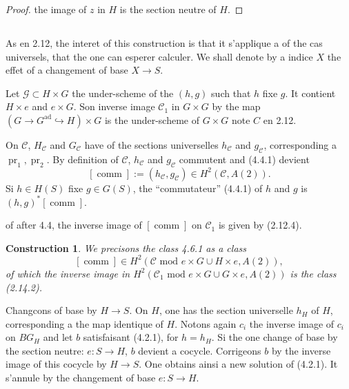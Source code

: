 \documentclass[11pt,a4paper]{article}
\theoremstyle{plain}
\newtheorem{construction}[theorem]{Construction}
\theoremstyle{definition}
\DeclareMathOperator{\ad}{ad}
\DeclareMathOperator{\pr}{pr}
\DeclareMathOperator{\comm}{comm}
\begin{document}
\begin{proof}
the image of $z$ in $H$ is the section neutre of $H$.
\end{proof}

\subsection{}\label{4.6}

As en 2.12, the interet of this construction is that it s'applique a of the cas universels, that the one can esperer calculer. We shall denote by a indice $X$ the effet of a changement of base $X \to S$.

Let $\mathscr{G} \subset H \times G$ the under-scheme of the $(h, g)$ such that $h$ fixe $g$. It contient $H \times e$ and $e \times G$. Son inverse image $\mathscr{C}_1$ in $G \times G$ by the map $(G \to G^{\ad} \hookrightarrow H) \times G$ is the under-scheme of $G \times G$ note $C$ en 2.12.

On $\mathscr{C}$, $H_{\mathscr{C}}$ and $G_{\mathscr{C}}$ have of the sections universelles $h_{\mathscr{C}}$ and $g_{\mathscr{C}}$, corresponding a $\pr_1, \pr_2$. By definition of $\mathscr{C}$, $h_{\mathscr{C}}$ and $g_{\mathscr{C}}$ commutent and (4.4.1) devient
\begin{equation}\label{4.6.1}
[\comm] := (h_{\mathscr{C}}, g_{\mathscr{C}}) \in H^2(\mathscr{C}, A(2)).
\end{equation}
Si $h \in H(S)$ fixe $g \in G(S)$, the ``commutateur'' (4.4.1) of $h$ and $g$ is $(h, g)^*[\comm]$.

of after 4.4, the inverse image of $[\comm]$ on $\mathscr{C}_1$ is given by (2.12.4).

\begin{construction}\label{4.7}
We precisons the class 4.6.1 as a class
\[
[\comm] \in H^2(\mathscr{C} \text{ mod } e \times G \cup H \times e, A(2)),
\]
of which the inverse image in $H^2(\mathscr{C}_1 \text{ mod } e \times G \cup G \times e, A(2))$ is the class (2.14.2).
\end{construction}

Changcons of base by $H \to S$. On $H$, one has the section universelle $h_H$ of $H$, corresponding a the map identique of $H$. Notons again $c_i$ the inverse image of $c_i$ on $BG_H$ and let $b$ satisfaisant (4.2.1), for $h = h_H$. Si the one change of base by the section neutre: $e : S \to H$, $b$ devient a cocycle. Corrigeons $b$ by the inverse image of this cocycle by $H \to S$. One obtains ainsi a new solution of (4.2.1). It s'annule by the changement of base $e : S \to H$.
\end{document}
